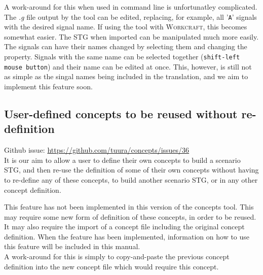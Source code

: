\documentclass{proc}
\newcommand{\noun}[1]{\textsc{#1}}
\begin{document}
A work-around for this when used in command line is unfortunatley complicated. 
The \emph{.g} file output by the tool can be edited, replacing, for example, all '\texttt{A}' signals with the desired signal name.
If using the tool with \noun{Workcraft}, this becomes somewhat easier. The STG when imported can be manipulated much more easily. 
The signals can have their names changed by selecting them and changing the property. 
Signals with the same name can be selected together (\texttt{shift-left mouse button}) and their name can be edited at once. 
This, however, is still not as simple as the singal names being included in the translation, and we aim to implement this feature soon. 

\subsection*{User-defined concepts to be reused without re-definition}

Github issue: \url{https://github.com/tuura/concepts/issues/36}\\

It is our aim to allow a user to define their own concepts to build a scenario STG, and then re-use the definition of some of their own concepts without having to re-define any of 
these concepts, to build another scenario STG, or in any other concept definition. 

This feature has not been implemented in this version of the concepts tool. This may require some new form of definition of these concepts, in order to be reused. It may also require the 
import of a concept file including the original concept definition. When the feature has been implemented, information on how to use this feature will be included in this manual.  \\

A work-around for this is simply to copy-and-paste the previous concept definition into the new concept file which would require this concept. 

\newpage

%
%
%
%



\end{document}
